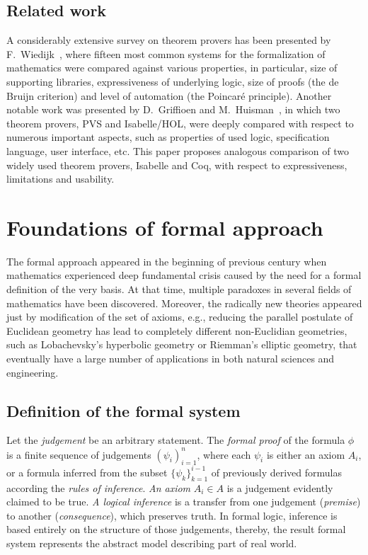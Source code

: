 \documentclass[article]{aaltoseries}
\begin{document}


\subsection{Related work}
A considerably extensive survey on theorem provers has been presented by F.~Wiedijk~\cite{Wie03}, where fifteen most common systems for the formalization of mathematics were compared against various properties, in particular, size of supporting libraries, expressiveness of underlying logic, size of proofs (the de Bruijn criterion) and level of automation (the Poincaré principle). 
Another notable work was presented by D.~Griffioen and M.~Huisman~\cite{Griff98}, in which two theorem provers, PVS and Isabelle/HOL, were deeply compared with respect to numerous important aspects, such as properties of used logic, specification language, user interface, etc. This paper proposes analogous comparison of two widely used theorem provers, Isabelle and Coq, with respect to expressiveness, limitations and usability.



\section{Foundations of formal approach}
\label{sec:formal_theory}

The formal approach appeared in the beginning of previous century when mathematics experienced deep fundamental crisis caused by the need for a formal definition of the very basis. At that time, multiple paradoxes in several fields of mathematics have been discovered. Moreover, the radically new theories appeared just by modification of the set of axioms, e.g., reducing the parallel postulate of Euclidean geometry has lead to completely different non-Euclidian geometries, such as Lobachevsky's hyperbolic geometry or Riemman's elliptic geometry, that eventually have a large number of applications in both natural sciences and engineering.


\subsection{Definition of the formal system}
\label{sec:definitions}


Let the \textit{judgement} be an arbitrary statement. The \textit{formal proof} of the formula $\phi$ is a finite sequence of judgements $ ( \psi_i )_{i=1}^{n} $, where each $\psi_i$ is either an axiom $A_i$, or a formula inferred from the subset $\{ \psi_k \}_{k=1}^{i-1}$ of previously derived formulas according the \textit{rules of inference}. \textit{An axiom} $A_i \in A$ is a judgement evidently claimed to be true. \textit{A logical inference} is a transfer from one judgement (\textit{premise}) to another (\textit{consequence}), which preserves truth. In formal logic, inference is based entirely on the structure of those judgements, thereby, the result formal system represents the abstract model describing part of real world.
\end{document}
